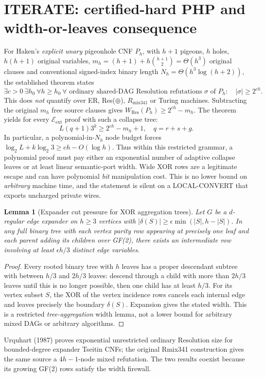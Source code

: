 \documentclass[11pt]{article}
\newtheorem{lemma}[theorem]{Lemma}
\begin{document}
\section*{ITERATE: certified-hard PHP and width-or-leaves consequence}
For Haken's \emph{explicit unary} pigeonhole CNF \(P_h\), with \(h+1\) pigeons, \(h\) holes, \(h(h+1)\) original variables, \(m_h=(h+1)+h\binom{h+1}{2}=\Theta(h^3)\) original clauses and conventional signed-index binary length \(N_h=\Theta(h^3\log(h+2))\), the established theorem states
\[
 \exists c>0\ \exists h_0\ \forall h\ge h_0\ \forall
 \text{ ordinary shared-DAG Resolution refutations }\sigma\text{ of }P_h:
 \quad |\sigma|\ge2^{ch}.
\]
This does \emph{not} quantify over ER, Res(\(\oplus\)), \(R_{\mathrm{mix341}}\) or Turing machines. Subtracting the original \(m_h\) free source clauses gives \(W_{\mathrm{Res}}(P_h)\ge2^{ch}-m_h\). The theorem yields for every \(\mathcal E_{\mathrm{ext}}\) proof with such a collapse tree:
\[
\boxed{L(q+1)3^k\ge 2^{ch}-m_h+1,\quad q=r+s+g.}
\]
In particular, a polynomial-in-\(N_h\) node budget forces
\(\log_2 L+k\log_2 3\ge ch-O(\log h)\).
Thus within this restricted grammar, a polynomial proof must pay either an exponential number of adaptive collapse leaves or at least linear semantic-port width. Wide XOR rows are a legitimate escape and can have polynomial \emph{bit} manipulation cost. This is no lower bound on \emph{arbitrary} machine time, and the statement is silent on a LOCAL-CONVERT that exports uncharged private wires.

\begin{lemma}[Expander cut pressure for XOR aggregation trees]
Let \(G\) be a \(d\)-regular edge expander on \(h\ge3\) vertices with \(|\delta(S)|\ge\epsilon\min(|S|,h-|S|)\). In any full binary tree with each vertex parity row appearing at precisely one leaf and each parent adding its children over GF(2), there exists an intermediate row involving at least \(\epsilon h/3\) distinct edge variables.
\end{lemma}
\begin{proof} Every rooted binary tree with \(h\) leaves has a proper descendant subtree with between \(h/3\) and \(2h/3\) leaves: descend through a child with more than \(2h/3\) leaves until this is no longer possible, then one child has at least \(h/3\). For its vertex subset \(S\), the XOR of the vertex incidence rows cancels each internal edge and leaves precisely the boundary \(\delta(S)\). Expansion gives the stated width. This is a restricted \emph{tree-aggregation} width lemma, not a lower bound for arbitrary mixed DAGs or arbitrary algorithms.
\end{proof}
Urquhart (1987) proves exponential unrestricted ordinary Resolution size for bounded-degree expander Tseitin CNFs; the original Rmix341 construction gives the same source a \(4h-1\)-node mixed refutation. The two results coexist because its growing GF(2) rows satisfy the width firewall.
\end{document}
